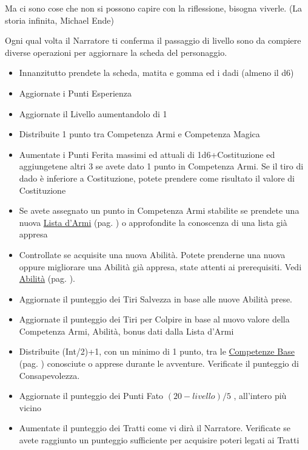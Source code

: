 \begin{multicols}{2}
\begin{changemargin}{0.3cm}{0.3cm}\begin{enfasi}{
Ma ci sono cose che non si possono capire con la riflessione, bisogna viverle. (La storia infinita, Michael Ende)
}\end{enfasi}\end{changemargin}

Ogni qual volta il Narratore ti conferma il passaggio di livello sono da compiere diverse operazioni per aggiornare la scheda del personaggio.

\begin{itemize}[leftmargin=*] \setlength{\itemsep}{0pt}
\item Innanzitutto prendete la scheda, matita e gomma ed i dadi (almeno il d6)
\item Aggiornate i Punti Esperienza
\item Aggiornate il Livello aumentandolo di 1
\item Distribuite 1 punto tra Competenza Armi e Competenza Magica
\item Aumentate i Punti Ferita massimi ed attuali di 1d6+Costituzione ed aggiungetene altri 3 se avete dato 1 punto in Competenza Armi. Se il tiro di dado è inferiore a Costituzione, potete prendere come risultato il valore di Costituzione
\item Se avete assegnato un punto in Competenza Armi stabilite se prendete una nuova \hyperlink{lista.armi}{Lista d'Armi} (pag. \pageref{lista.armi}) o approfondite la conoscenza di una lista già appresa
\item Controllate se acquisite una nuova Abilità. Potete prenderne una nuova oppure migliorare una Abilità già appresa, state attenti ai prerequisiti. Vedi \hyperlink{abilita}{Abilità} (pag. \pageref{abilita}).
\item Aggiornate il punteggio dei Tiri Salvezza in base alle nuove Abilità prese.
\item Aggiornate il punteggio dei Tiri per Colpire in base al nuovo valore della Competenza Armi, Abilità, bonus dati dalla Lista d'Armi
\item Distribuite (Int/2)+1, con un minimo di 1 punto, tra le \hyperlink{competenzeelenco}{Competenze Base} (pag. \pageref{competenzeelenco}) conosciute o apprese durante le avventure. Verificate il punteggio di Consapevolezza.
\item Aggiornate il punteggio dei Punti Fato $(20-livello)/5$ , all'intero più vicino
\item Aumentate il punteggio dei Tratti come vi dirà il Narratore. Verificate se avete raggiunto un punteggio sufficiente per acquisire poteri legati ai Tratti

\end{itemize}
\end{multicols}

